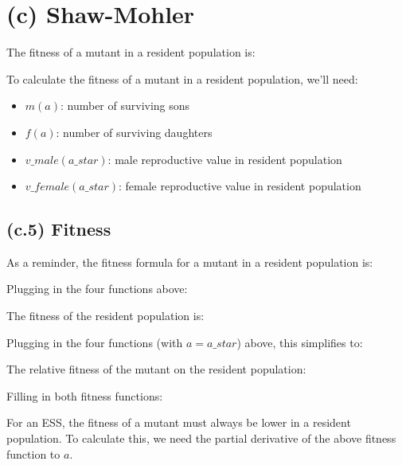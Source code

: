 \documentclass[11]{article}
\begin{document}
\section{(c) Shaw-Mohler}

The fitness of a mutant in a resident population is:



To calculate the fitness of a mutant in a resident population, we'll need:

\begin{itemize}
  \item $m(a)$: number of surviving sons
  \item $f(a)$: number of surviving daughters
  \item $v\_male(a\_star)$: male reproductive value in resident population
  \item $v\_female(a\_star)$: female reproductive value in resident population
\end{itemize}

\subsection{(c.5) Fitness}

As a reminder, the fitness formula for a mutant in a resident population is:



Plugging in the four functions above:



The fitness of the resident population is: 



Plugging in the four functions (with $a=a\_star$) above, this simplifies to:



The relative fitness of the mutant on the resident population:



Filling in both fitness functions:



For an ESS, the fitness of a mutant must always be lower in a resident population. To calculate this, we need the partial derivative of the above fitness function to $a$.


\end{document}
